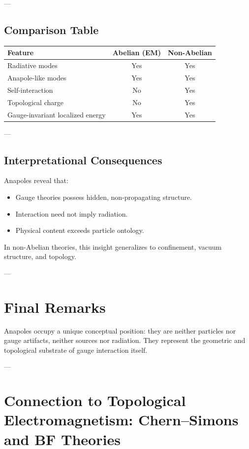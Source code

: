 \documentclass[11pt]{article}
\begin{document}
---

\subsection{Comparison Table}

\begin{center}
\begin{tabular}{l|c|c}
Feature & Abelian (EM) & Non-Abelian \\ \hline
Radiative modes & Yes & Yes \\
Anapole-like modes & Yes & Yes \\
Self-interaction & No & Yes \\
Topological charge & No & Yes \\
Gauge-invariant localized energy & Yes & Yes
\end{tabular}
\end{center}

---

\subsection{Interpretational Consequences}

Anapoles reveal that:

\begin{itemize}
\item Gauge theories possess hidden, non-propagating structure.
\item Interaction need not imply radiation.
\item Physical content exceeds particle ontology.
\end{itemize}

In non-Abelian theories, this insight generalizes to confinement, vacuum structure, and topology.

---

\section*{Final Remarks}

Anapoles occupy a unique conceptual position:
they are neither particles nor gauge artifacts, neither sources nor radiation.
They represent the geometric and topological substrate of gauge interaction itself.

---
\section{Connection to Topological Electromagnetism: Chern--Simons and BF Theories}
\end{document}
